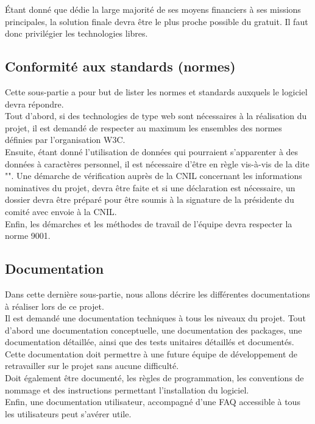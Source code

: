 Étant donné que \nomClient{} dédie la large majorité de ses moyens financiers à ses missions principales, la solution finale devra être le plus proche possible du gratuit. Il faut donc privilégier les technologies libres.


\subsection{Conformité aux standards (normes)}
Cette sous-partie a pour but de lister les normes et standards auxquels le logiciel devra répondre.\\

Tout d'abord, si des technologies de type web sont nécessaires à la réalisation du projet, il est demandé de respecter au maximum les ensembles des normes définies par l'organisation W3C.\\

Ensuite, étant donné l'utilisation de données qui pourraient s'apparenter à des données à caractères personnel, il est nécessaire d'être en règle vis-à-vis de la \loiInfoLib{} dite "\loiInfoLibCourt{}". Une démarche de vérification auprès de la CNIL concernant les informations nominatives du projet, devra être faite et si une déclaration est nécessaire, un dossier devra être préparé pour être soumis à la signature de la présidente du comité avec envoie à la CNIL.\\

Enfin, les démarches et les méthodes de travail de l'équipe \PICCourt{} devra respecter la norme \ISOCourt{} 9001.

\subsection{Documentation}
\label{doc}
Dans cette dernière sous-partie, nous allons décrire les différentes documentations à réaliser lors de ce projet.\\

Il est demandé une documentation techniques à tous les niveaux du projet. Tout d'abord une documentation conceptuelle, une documentation des packages, une documentation détaillée, ainsi que des tests unitaires détaillés et documentés. Cette documentation doit permettre à une future équipe de développement de retravailler sur le projet sans aucune difficulté.\\

Doit également être documenté, les règles de programmation, les conventions de nommage et des instructions permettant l'installation du logiciel.\\

Enfin, une documentation utilisateur, accompagné d'une FAQ accessible à tous les utilisateurs peut s'avérer utile.